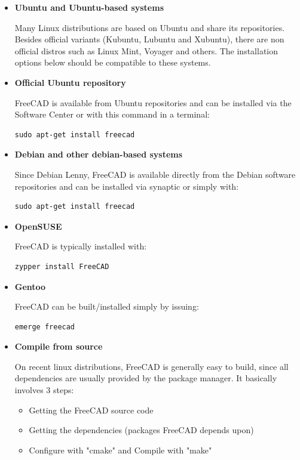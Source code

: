 \begin{itemize}
\item
\textbf{Ubuntu and Ubuntu-based systems}

Many Linux distributions are based on Ubuntu and share its repositories. Besides official variants (Kubuntu, Lubuntu and Xubuntu), there are non official distros such as Linux Mint, Voyager and others. The installation options below should be compatible to these systems.

\item 
\textbf{Official Ubuntu repository}

FreeCAD is available from Ubuntu repositories and can be installed via the Software Center or with this command in a terminal:

\begin{verbatim}
sudo apt-get install freecad
\end{verbatim}

\item
\textbf{Debian and other debian-based systems}

Since Debian Lenny, FreeCAD is available directly from the Debian software repositories and can be installed via synaptic or simply with:

\begin{verbatim}
sudo apt-get install freecad
\end{verbatim}

\item
\textbf{OpenSUSE}

FreeCAD is typically installed with:

\begin{verbatim}
zypper install FreeCAD
\end{verbatim}

\item
\textbf{Gentoo}

FreeCAD can be built/installed simply by issuing:

\begin{verbatim}
emerge freecad
\end{verbatim}

\item
\textbf{Compile from source}

On recent linux distributions, FreeCAD is generally easy to build, since all dependencies are usually provided by the package manager. It basically involves 3 steps:

\begin{itemize}
\item Getting the FreeCAD source code
\item Getting the dependencies (packages FreeCAD depends upon)
\item Configure with "cmake" and Compile with "make"
\end{itemize}


\end{itemize}
